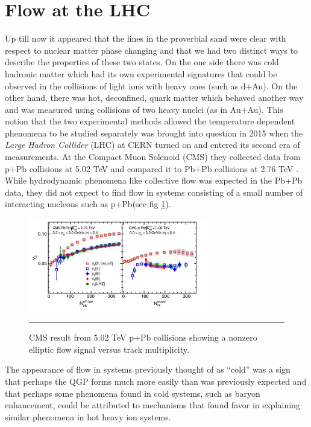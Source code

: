 \section{Flow at the LHC}
Up till now it appeared that the lines in the proverbial sand were clear with respect to nuclear matter phase changing and that we had two distinct ways to describe the properties of these two states. On the one side there was cold hadronic matter which had its own experimental signatures that could be observed in the collisions of light ions with heavy ones (such as d+Au). On the other hand, there was hot, deconfined, quark matter which behaved another way and was measured using collisions of two heavy nuclei (as in Au+Au). This notion that the two experimental methods allowed the temperature dependent phenomena to be studied separately was brought into question in 2015 when the \textit{Large Hadron Collider} (LHC) at CERN turned on and entered its second era of measurements. At the Compact Muon Solenoid (CMS) they collected data from p+Pb collisions at 5.02 TeV and compared it to Pb+Pb collisions at 2.76 TeV \citep{Khachatryan:2015waa}. While hydrodynamic phenomena like collective flow was expected in the Pb+Pb data, they did not expect to find flow in systems consisting of a small number of interacting nucleons such as p+Pb(see fig \ref{fig:pPbflow}).

\begin{figure}[htbp!]
  \centering
    \includegraphics[width=0.7\textwidth]{prevplots/pPbflowLHC.JPG}
    \rule{35em}{0.5pt}
  \caption[Elliptic Flow in p+Pb at the LHC]{CMS result from 5.02 TeV p+Pb collisions showing a nonzero elliptic flow signal versus track multiplicity. \citep{Khachatryan:2015waa}}
  \label{fig:pPbflow}
\end{figure} 

The appearance of flow in systems previously thought of as ``cold'' was a sign that perhaps the QGP forms much more easily than was previously expected and that perhaps some phenomena found in cold systems, such as baryon enhancement, could be attributed to mechanisms that found favor in explaining similar phenomena in hot heavy ion systems.

